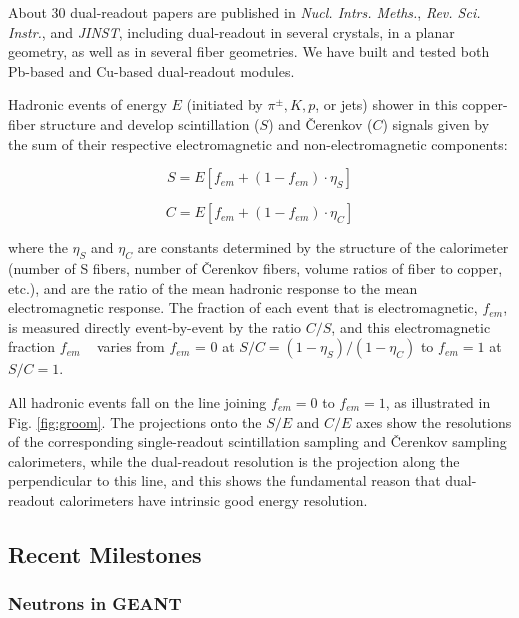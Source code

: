 About 30 dual-readout papers are published in {\it Nucl. Intrs. Meths.}, {\it Rev. Sci. Instr.}, and {\it JINST}, including
dual-readout in several crystals, in a planar geometry, as well as in several fiber geometries. We have built
and tested both Pb-based and Cu-based dual-readout modules.   

Hadronic events of energy $E$ (initiated by $\pi^{\pm}, K, p$, or jets) shower in this copper-fiber structure and develop scintillation ($S$) and 
\v{C}er\-enk\-ov ($C$) signals given by the sum of their respective electromagnetic and non-electromagnetic components:

\begin{displaymath}
  S = E [ f_{em} + (1 - f_{em}) \cdot \eta_S ]
\end{displaymath}

\begin{displaymath}
  C = E [ f_{em} + (1 - f_{em}) \cdot \eta_C ]
\end{displaymath}

\noindent where the $\eta_S$ and $\eta_C$ are constants determined by the structure of the calorimeter (number of S fibers, number of \v{C}er\-enk\-ov fibers, volume ratios of fiber to copper, etc.), and are the ratio of the mean hadronic response to the mean electromagnetic response.  The fraction of each event that is electromagnetic, $f_{em}$, is measured directly event-by-event by the ratio $C/S$, and this electromagnetic fraction $f_{em}$ ~ varies from $f_{em}$ = 0 at $S/C = (1-\eta_S)/(1-\eta_C)$ to $f_{em}=1$ at $S/C=1$.

All hadronic events fall on the line joining $f_{em}=0$ to $f_{em}=1$, as illustrated in Fig. \ref{fig:groom}.  The projections 
onto the $S/E$ and $C/E$   axes show the resolutions of the corresponding single-readout scintillation sampling and \v{C}er\-enk\-ov sampling calorimeters, while the dual-readout resolution is the projection along the perpendicular to this line, and
  this shows the fundamental reason that dual-readout calorimeters have intrinsic good energy resolution.

\subsection{Recent Milestones}

\subsubsection{Neutrons in GEANT} 
\label{sec:geant}  

